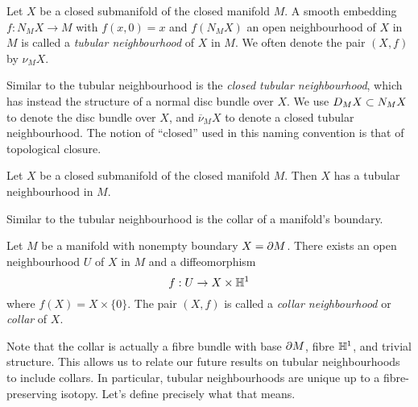 \begin{defn}
	\label{def:tubularneighbourhood}
	Let $X$ be a closed submanifold of the closed manifold $M$.
	A smooth embedding $f:N_M X\to M$ with $f(x,0)=x$ and $f(N_M X)$ an open neighbourhood of $X$ in $M$ is called a \emph{tubular neighbourhood} of $X$ in $M$.
	We often denote the pair $(X,f)$ by $\nu_M X$.
\end{defn}

Similar to the tubular neighbourhood is the \emph{closed tubular neighbourhood}, which has instead the structure of a normal disc bundle over $X$.
We use $D_M X\subset N_M X$ to denote the disc bundle over $X$, and $\overline{\nu}_M X$ to denote a closed tubular neighbourhood.
The notion of ``closed'' used in this naming convention is that of topological closure.

\begin{theorem}
	\label{thm:tubularneighbourhood}
	Let $X$ be a closed submanifold of the closed manifold $M$.
	Then $X$ has a tubular neighbourhood in $M$.
\end{theorem}

Similar to the tubular neighbourhood is the collar of a manifold's boundary.

\begin{prop}[Collar]
	\label{defthm:collar}
	Let $M$ be a manifold with nonempty boundary $X = \partial M$.
	There exists an open neighbourhood $U$ of $X$ in $M$ and a diffeomorphism
	\[
	f: U \to X\times\mathbb{H}^1
	\]
	where $f(X)=X\times \{0\}$.
	The pair $(X,f)$ is called a \emph{collar neighbourhood} or \emph{collar} of $X$.	
\end{prop}

Note that the collar is actually a fibre bundle with base $\partial M$, fibre $\mathbb{H}^1$, and trivial structure.
This allows us to relate our future results on tubular neighbourhoods to include collars.
In particular, tubular neighbourhoods are unique up to a fibre-preserving isotopy.
Let's define precisely what that means.


